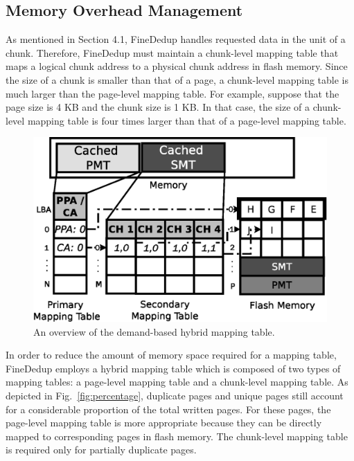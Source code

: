 \subsection{Memory Overhead Management}

As mentioned in Section 4.1,
FineDedup handles requested data in the unit of a chunk.
Therefore, FineDedup must maintain a chunk-level mapping table
that maps a logical chunk address to a physical chunk address in flash memory.
Since the size of a chunk is smaller than that of a page,
a chunk-level mapping table is much larger than the page-level mapping table.
For example, suppose that the page size is 4 KB and the chunk size is 1 KB.
In that case, the size of a chunk-level mapping table is four times larger than that of a page-level mapping table.

\begin{figure}[t]
	\center
	\includegraphics[scale=0.5]{figure/finededup/hybridmapping_1}
	\caption{An overview of the demand-based hybrid mapping table.} %
	\label{fig:hybridmapping}
\end{figure}

In order to reduce the amount of memory space required for a mapping table,
FineDedup employs a hybrid mapping table
which is composed of two types of mapping tables:
a page-level mapping table and a chunk-level mapping table.
As depicted in Fig.~\ref{fig:percentage}, 
duplicate pages and unique pages still account for a considerable proportion of the total written pages.
For these pages, the page-level mapping table is more appropriate 
because they can be directly mapped to corresponding pages in flash memory.
The chunk-level mapping table is required only for partially duplicate pages.

